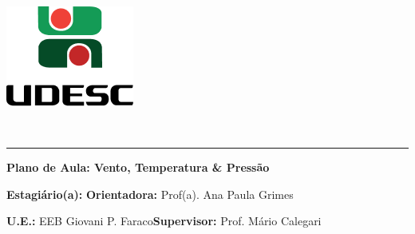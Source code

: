 \documentclass[
12pt,				%
openright,			%
oneside,			%
a4paper,			%
chapter=TITLE,		%
english,			%
brazil				%
]{abntex2}
\begin{document}
\thispagestyle{empty}
\begin{center}
	\begin{minipage}[!]{\linewidth}
		\begin{minipage}[!]{.19\linewidth}
			\includegraphics[width=\linewidth]{img/logo.png}           
		\end{minipage}
		\begin{minipage}[!]{.8\linewidth}
			\center
			\ABNTEXchapterfont\normalsize\MakeUppercase{\imprimirinstituicao}
			\par
			\vspace*{10pt}                     
			\ABNTEXchapterfont\normalsize\MakeUppercase{\centro}
			\par
			\vspace*{10pt}           
			\ABNTEXchapterfont\normalsize\MakeUppercase{\disciplina}
		\end{minipage}        
	\end{minipage}
	\\ \vspace{0.5cm}
	\rule{\textwidth}{.5pt}   
\end{center}
\textual
\begin{center}
	\textbf{Plano de Aula: Vento, Temperatura \& Pressão}
\end{center}
\par\noindent\textbf{Estagiário(a):} \imprimirautor\hfill{}\textbf{Orientadora:} Prof(a). Ana Paula Grimes
\par\noindent\textbf{U.E.:} EEB Giovani P. Faraco\hfill{}\textbf{Supervisor:} Prof. Mário Calegari
\end{document}
